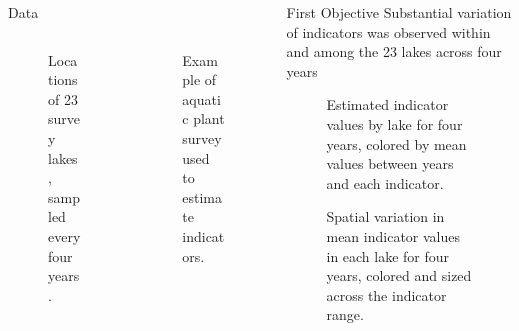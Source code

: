 \documentclass[final,t]{beamer}\usepackage[]{graphicx}\usepackage[]{color}
\begin{document}
\begin{frame}{}
\begin{columns}[t]
\begin{column}{.31\linewidth}
\begin{block}{Data}
\begin{columns}[b]
\begin{column}{0.45\linewidth}

  \begin{figure}
\caption{\footnotesize Locations of 23 survey lakes, sampled every four years.}
\end{figure}

\end{column}
\begin{column}{0.45\linewidth}


  \begin{figure}
\caption{\footnotesize Example of aquatic plant survey used to estimate indicators.}
\end{figure}
\end{column}
\end{columns}
\vspace{-1.45cm}
\end{block}

\end{column}

  \begin{column}{.31\linewidth}

  \begin{block}{First Objective}
Substantial \alert{variation} of indicators was observed \alert{within and among} the 23 lakes across \alert{four years}


\begin{figure}
\caption{\footnotesize Estimated indicator values by lake for four years, colored by mean values between years and each indicator.}
\end{figure}
\vspace{-1cm}


\begin{figure}
\caption{\footnotesize Spatial variation in mean indicator values in each lake for four years, colored and sized across the indicator range.}
\end{figure}				
\vspace{-2cm}


\end{block}
\end{column}
\end{columns}
\end{frame}
\end{document}
